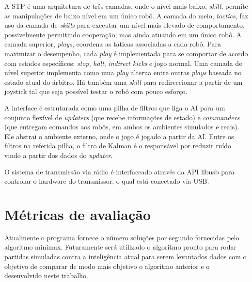 A STP é uma arquitetura de três camadas, onde o nível mais baixo, \textit{skill},
permite as manipulações de baixo nível em um único robô. A camada do meio,
\textit{tactics}, faz uso da camada de \textit{skills} para executar um nível
mais elevado de comportamento, possivelmente permitindo cooperação, mas ainda
atuando em um único robô. A camada superior, \textit{plays}, coordena as táticas
associadas a cada robô. Para maximizar o desempenho, cada \textit{play} é
implementada para se comportar de acordo com estados específicos:
\textit{stop}, \textit{halt}, \textit{indirect kicks} e jogo normal.
Uma camada de nível superior implementa como uma \textit{play} alterna entre
outras \textit{plays} baseada no estado atual do árbitro.
Há também uma \textit{skill} para redireccionar a partir de um joystick tal que
seja possível testar o robô com pouco esforço.

A interface é estruturada como uma pilha de filtros que liga o AI para um
conjunto flexível de \textit{updaters} (que recebe informações de estado) e
\textit{commanders} (que entregam comandos aos robôs, em ambos os ambientes simulados
e reais). Ele abstrai o ambiente externo, onde o jogo é jogado a partir da AI\@.
Entre os filtros na referida pilha, o filtro de Kalman é o responsável por
reduzir ruído vindo a partir dos dados do \textit{updater}.

O sistema de transmissão via rádio é interfaceado através da  API libusb para
controlar o hardware do transmissor, o qual está conectado via USB\@.

\section{Métricas de avaliação}\label{sec:metricas}

Atualmente o programa fornece o número soluções por segundo fornecidas pelo
algoritmo minimax. Futuramente será utilizado o algoritmo pronto para rodar
partidas simuladas contra a inteligência atual para serem levantados dados com
o objetivo de comparar de modo mais objetivo o algoritmo anterior e o
desenvolvido neste trabalho.

